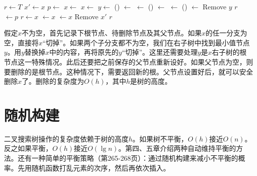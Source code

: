 \documentclass[b5paper]{ctexart}
\begin{document}
\begin{algorithmic}[1]
  \State $r \gets T$
  \State $x' \gets x$ 
  \State $p \gets $ 
    \State $x \gets $ 
    \State $x \gets $ 
  \Else
    \State  $y \gets $ ()
    \State {} $\gets$ 
    \State {} $\gets$ 
      \State {}() $\gets$ 
    \Else
      \State {} $\gets$ 
    \EndIf
      \State {}() $\gets$ 
    \EndIf
    \State Remove $y$
    \State \Return $r$
  \EndIf
    \State {} $\gets p$
  \EndIf
    \State $r \gets x$
  \Else
      \State {} $\gets x$
    \Else
      \State {} $\gets x$
    \EndIf
  \EndIf
  \State Remove $x'$
  \State \Return $r$
\EndFunction
\end{algorithmic}

假定$x$不为空，首先记录下根节点、待删除节点及其父节点。如果$x$的任一分支为空，直接将$x$“切掉”。如果两个子分支都不为空，我们在右子树中找到最小值节点$y$。用$y$替换掉$x$中的内容，再将原先的$y$“切掉”。这里还需要处理$y$是$x$右子树的根节点这一特殊情况。此后还要把之前保存的父节点重新设好。如果父节点为空，则要删除的是根节点。这种情况下，需要返回新的根。父节点设置好后，就可以安全删除$x$了。删除的复杂度为$O(h)$，其中$h$是树的高度。

\begin{Exercise}
\end{Exercise}

\section{随机构建}
二叉搜索树操作的复杂度依赖于树的高度$h$。如果树不平衡，$O(h)$接近$O(n)$。反之如果平衡，$O(h)$接近$O(\lg n)$。第四、五章介绍两种自动维持平衡的方法。还有一种简单的平衡策略（\cite{CLRS}第265-268页）：通过随机构建来减小不平衡的概率。先用随机函数打乱元素的次序，然后再依次插入。
\end{document}
